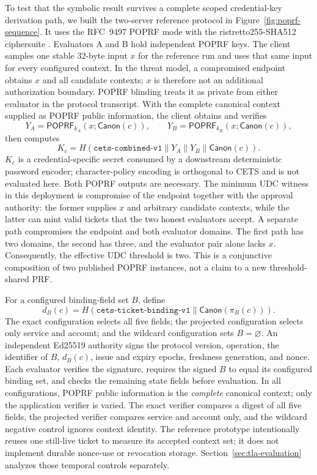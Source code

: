 \documentclass[preprint,12pt]{elsarticle}
\begin{document}
To test that the symbolic result survives a complete scoped credential-key
derivation path, we built the two-server reference protocol in
Figure~\ref{fig:poprf-sequence}.  It uses
the RFC~9497 POPRF mode with the ristretto255-SHA512 ciphersuite
\cite{rfc9497}.  Evaluators A and B hold independent POPRF keys.  The client
samples one stable 32-byte input $x$ for the reference run and uses that same
input for every configured context.  In the threat model, a compromised
endpoint obtains $x$ and all candidate contexts; $x$ is therefore not an
additional authorization boundary.  POPRF blinding treats it as private from
either evaluator in the protocol transcript.  With the complete canonical
context supplied as POPRF public information, the client obtains and verifies
\[
Y_A=\mathsf{POPRF}_{k_A}(x;\mathsf{Canon}(c)),\qquad
Y_B=\mathsf{POPRF}_{k_B}(x;\mathsf{Canon}(c)),
\]
then computes
\[
K_c=H(\mathtt{cets\mbox{-}combined\mbox{-}v1}\parallel
Y_A\parallel Y_B\parallel\mathsf{Canon}(c)).
\]
$K_c$ is a credential-specific secret consumed by a downstream deterministic
password encoder; character-policy encoding is orthogonal to CETS and is not
evaluated here.  Both POPRF outputs are necessary.  The minimum UDC witness in
this deployment is compromise of the endpoint together with the approval
authority: the former supplies $x$ and arbitrary candidate contexts, while the
latter can mint valid tickets that the two honest evaluators accept.  A
separate path compromises the endpoint and both evaluator domains.  The first
path has two domains, the second has three, and the evaluator pair alone lacks
$x$.  Consequently, the effective UDC threshold is two.  This is a conjunctive
composition of two published POPRF instances, not a claim to a new
threshold-shared PRF.

For a configured binding-field set $B$, define
\[
d_B(c)=H(\mathtt{cets\mbox{-}ticket\mbox{-}binding\mbox{-}v1}\parallel
          \mathsf{Canon}(\pi_B(c))).
\]
The exact configuration selects all five fields; the projected configuration
selects only service and account; and the wildcard configuration sets
$B=\varnothing$.  An independent Ed25519 authority signs the protocol version,
operation, the identifier of $B$, $d_B(c)$, issue and expiry epochs, freshness
generation, and nonce.  Each evaluator verifies the signature, requires the
signed $B$ to equal its configured binding set, and checks the remaining state
fields before evaluation.  In
all configurations, POPRF public information is the \emph{complete} canonical
context; only the application verifier is varied.  The exact verifier compares
a digest of all five fields, the projected verifier compares service and
account only, and the wildcard negative control ignores context identity.
The reference prototype intentionally reuses one still-live ticket to measure
its accepted context set; it does not implement durable nonce-use or revocation
storage.  Section~\ref{sec:tla-evaluation} analyzes those temporal controls
separately.
\end{document}
